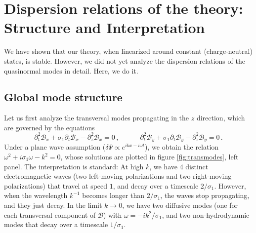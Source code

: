 \documentclass[a4paper, amsfonts, amssymb, amsmath, reprint, showkeys, nofootinbib, twoside,notitlepage]{revtex4-1}
\newcommand{\spc}{\quad \quad \quad}
\theoremstyle{definition}
\theoremstyle{theorem}
\begin{document}





\newpage
\section*{Dispersion relations of the theory: Structure and Interpretation}

We have shown that our theory, when linearized around constant (charge-neutral) states, is stable. However, we did not yet analyze the dispersion relations of the quasinormal modes in detail. Here, we do it.

\vspace{-0.1cm}
\subsection{Global mode structure}
\vspace{-0.1cm}

Let us first analyze the transversal modes propagating in the $z$ direction, which are governed by the equations
\begin{equation}\label{cattenoB}
\partial_t^2 \mathcal{B}_x +\sigma_1 \partial_t \mathcal{B}_x -\partial^2_z \mathcal{B}_x =0 \, , \spc  \partial_t^2 \mathcal{B}_y +\sigma_1 \partial_t \mathcal{B}_y -\partial^2_z \mathcal{B}_y =0 \, .
\end{equation}
Under a plane wave assumption ($\delta\Psi\propto e^{ikx-i\omega t}$), we obtain the relation $\omega^2+i\sigma_1\omega-k^2=0$, whose solutions are plotted in figure \ref{fig:transmodes}, left panel. The interpretation is standard: At high $k$, we have 4 distinct electromagnetic waves (two left-moving polarizations and two right-moving polarizations) that travel at speed $1$, and decay over a timescale $2/\sigma_1$. However, when the wavelength $k^{-1}$ becomes longer than $2/\sigma_1$, the waves stop propagating, and they just decay. In the limit $k\rightarrow 0$, we have two diffusive modes (one for each transversal component of $\mathcal{B}$) with $\omega=-ik^2/\sigma_1$, and two non-hydrodynamic modes that decay over a timescale $1/\sigma_1$.
\end{document}
